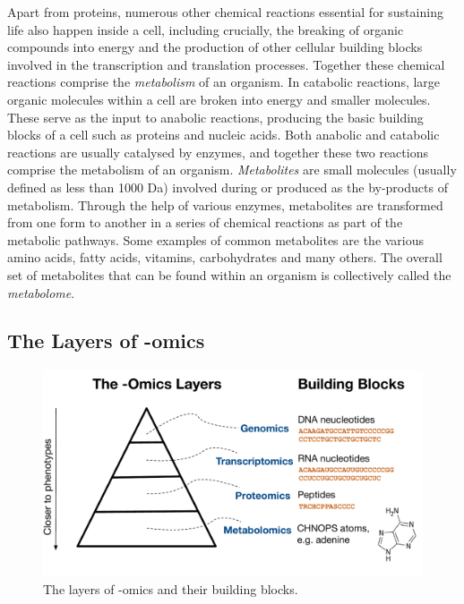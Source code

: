 Apart from proteins, numerous other chemical reactions essential for sustaining life also happen inside a cell, including crucially, the breaking of organic compounds into energy and the production of other cellular building blocks involved in the transcription and translation processes. Together these chemical reactions comprise the \emph{metabolism} of an organism. In catabolic reactions, large organic molecules within a cell are broken into energy and smaller molecules. These serve as the input to anabolic reactions, producing the basic building blocks of a cell such as proteins and nucleic acids. Both anabolic and catabolic reactions are usually catalysed by enzymes, and together these two reactions comprise the metabolism of an organism. \emph{Metabolites} are small molecules (usually defined as less than 1000 Da) involved during or produced as the by-products of metabolism. Through the help of various enzymes, metabolites are transformed from one form to another in a series of chemical reactions as part of the metabolic pathways. Some examples of common metabolites are the various amino acids, fatty acids, vitamins, carbohydrates and many others. The overall set of metabolites that can be found within an organism is collectively called the \emph{metabolome}.


\subsection{The Layers of -omics}

\begin{figure}
\noindent \begin{centering}
\includegraphics[width=1.0\textwidth]{02-background/figures/omics}
\par\end{centering}
\caption{\label{fig:omics-triangle}The layers of -omics and their building blocks.}
\end{figure}

